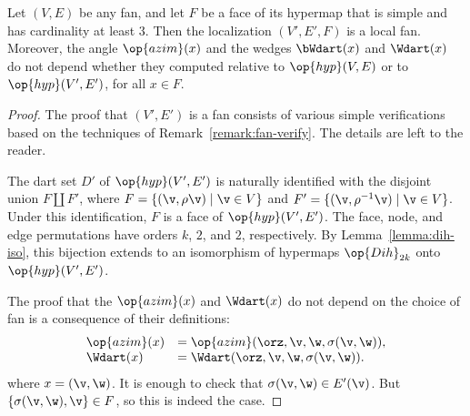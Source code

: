 \begin{lemma}[localization]
\label{lemma:localization}
Let $(V,E)$ be any fan, and let $F$ be a face of its hypermap that is
simple and has cardinality at least $3$.  Then the localization
$(V',E',F)$ is a local fan.  Moreover, the angle $\op{azim}(x)$ and
the wedges $\bWdart(x)$ and $\Wdart(x)$ do not depend whether they
computed relative to $\op{hyp}(V,E)$ or to $\op{hyp}(V',E')$, for all
$x\in F$.
\end{lemma}



\begin{proof}
The proof that $(V',E')$ is a fan consists of various simple
verifications based on the techniques of
Remark~\ref{remark:fan-verify}.  The details are left to the reader.

The dart set $D'$ of $\op{hyp}(V',E')$ is naturally identified with
the disjoint union $F\coprod F'$, where $F = \{(\v,\rho\v) \mid \v\in
V\}$ and $F'=\{(\v,\rho^{-1}\v) \mid \v\in V\}$.  Under this
identification, $F$ is a face of $\op{hyp}(V',E')$.  The face, node,
and edge permutations have orders $k$, $2$, and $2$, respectively.  By
Lemma~\ref{lemma:dih-iso}, this bijection extends to an isomorphism of
hypermaps $\op{Dih}_{2k}$ onto $\op{hyp}(V',E')$.

The proof that the $\op{azim}(x)$ and $\Wdart(x)$ do not depend on the
choice of fan is a consequence of their definitions:
\begin{displaymath}
\begin{array}{lll}
\op{azim}(x) &= \op{azim}(\orz,\v,\w,\sigma(\v,\w)),\\
\Wdart(x) &= \Wdart(\orz,\v,\w,\sigma(\v,\w)).\\
\end{array}
\end{displaymath}
where $x = (\v,\w)$.  It is enough to check that $\sigma(\v,\w)\in
E'(\v)$.  But $\{\sigma(\v,\w),\v\}\in F$, so this is indeed the case.
\end{proof}



